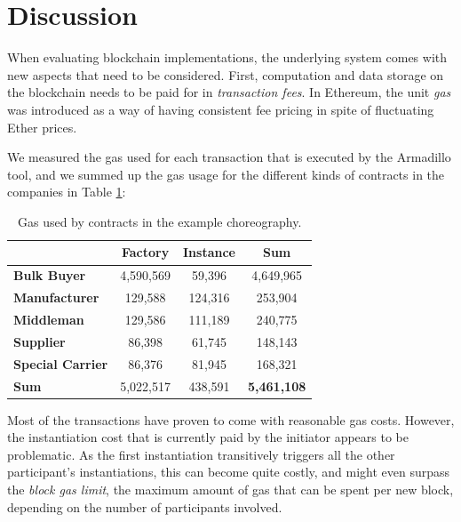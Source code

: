 \documentclass[runningheads]{llncs}
\begin{document}
\section{Discussion} \label{evaluation}

When evaluating blockchain implementations, the underlying system comes with new aspects that need to be considered.
First, computation and data storage on the blockchain needs to be paid for in \emph{transaction fees}.
In Ethereum, the unit \emph{gas} was introduced as a way of having consistent fee pricing in spite of fluctuating Ether prices.

We measured the gas used for each transaction that is executed by the Armadillo tool, and we summed up the gas usage for the different kinds of contracts in the companies in Table \ref{gasusage}:

\begin{table}
	\centering
	\caption{Gas used by contracts in the example choreography.} \label{gasusage}
	\begin{tabular}{|l | c | c | c|}
		\hline                          & \textbf{Factory} & \textbf{Instance} & \textbf{Sum}       \\
		\hline \textbf{Bulk Buyer}      & 4,590,569        & 59,396            & 4,649,965          \\
		\hline \textbf{Manufacturer}    & 129,588          & 124,316           & 253,904            \\
		\hline \textbf{Middleman}       & 129,586          & 111,189           & 240,775            \\
		\hline \textbf{Supplier}        & 86,398           & 61,745            & 148,143            \\
		\hline \textbf{Special Carrier} & 86,376           & 81,945            & 168,321            \\
		\hline \textbf{Sum}             & 5,022,517        & 438,591           & \textbf{5,461,108} \\ \hline
	\end{tabular}
\end{table}
Most of the transactions have proven to come with reasonable gas costs.
However, the instantiation cost that is currently paid by the initiator appears to be problematic.
As the first instantiation transitively triggers all the other participant's instantiations, this can become quite costly, and might even surpass the \emph{block gas limit}, the maximum amount of gas that can be spent per new block, depending on the number of participants involved.
\end{document}
